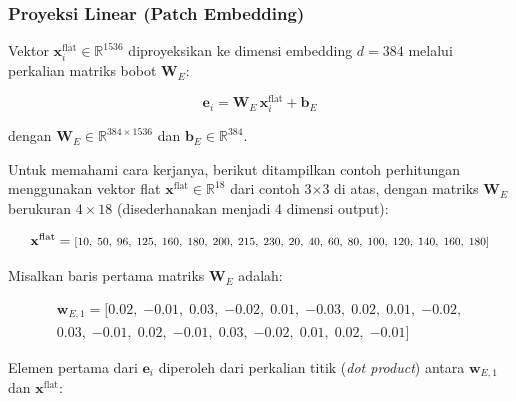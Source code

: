  
\subsubsection{Proyeksi Linear (Patch Embedding)}
 
Vektor $\mathbf{x}_i^{\text{flat}} \in \mathbb{R}^{1536}$ diproyeksikan
ke dimensi embedding $d=384$ melalui perkalian matriks bobot
$\mathbf{W}_E$:
 
\vspace{0.5cm}
\begin{equation}
  \mathbf{e}_i = \mathbf{W}_E\,\mathbf{x}_i^{\text{flat}} + \mathbf{b}_E
\end{equation}
\vspace{0.5cm}

\noindent
dengan $\mathbf{W}_E \in \mathbb{R}^{384\times1536}$ dan $\mathbf{b}_E \in \mathbb{R}^{384}$.
\vspace{0.5cm}
 
\noindent
Untuk memahami cara kerjanya, berikut ditampilkan contoh perhitungan
menggunakan vektor flat $\mathbf{x}^{\text{flat}} \in \mathbb{R}^{18}$
dari contoh 3$\times$3 di atas, dengan matriks $\mathbf{W}_E$
berukuran $4\times18$ (disederhanakan menjadi 4 dimensi output):
 
\vspace{0.5cm}
\begin{equation*}
  \mathbf{x}^{\text{flat}}
  = \scalebox{0.82}{\ensuremath{%
      [10,\;50,\;96,\;125,\;160,\;180,\;200,\;215,\;230,\;
       20,\;40,\;60,\;80,\;100,\;120,\;140,\;160,\;180]}}
\end{equation*}
\vspace{0.5cm}
 
\noindent
Misalkan baris pertama matriks $\mathbf{W}_E$ adalah:
 
\vspace{0.5cm}
\begin{multline*}
  \mathbf{w}_{E,1}
  = [0.02,\;{-0.01},\;0.03,\;{-0.02},\;0.01,\;{-0.03},\;
     0.02,\;0.01,\;{-0.02}, \\
     0.03,\;{-0.01},\;0.02,\;{-0.01},\;0.03,\;{-0.02},\;
     0.01,\;0.02,\;{-0.01}]
\end{multline*}
\vspace{0.5cm}
 
\noindent
Elemen pertama dari $\mathbf{e}_i$ diperoleh dari perkalian titik
(\textit{dot product}) antara $\mathbf{w}_{E,1}$ dan
$\mathbf{x}^{\text{flat}}$:
 
